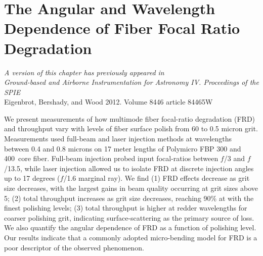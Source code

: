 \chapter[Fiber Focal Ration Degradation]{The Angular and Wavelength Dependence of Fiber Focal Ratio Degradation}
\label{chap:FRD}

\vfill

\begin{flushright}
  \fixspacing
  \textit{A version of this chapter has previously appeared in\\
    \emph{Ground-based and Airborne Instrumentation for Astronomy IV. Proceedings of the SPIE}}\\
    \vspace{1ex}
    Eigenbrot, Bershady, and Wood 2012. Volume 8446 article 84465W
\end{flushright}

\vspace{1in}

\cleardoublepage

\begin{chabstract}
  We present measurements of how multimode fiber focal-ratio degradation
  (FRD) and throughput vary with levels of fiber surface polish from 60
  to 0.5 micron grit. Measurements used full-beam and laser injection
  methods at wavelengths between 0.4 and 0.8 microns on 17 meter lengths
  of Polymicro FBP 300 and 400\mum\ core fiber. Full-beam injection
  probed input focal-ratios between $f$/3 and $f$/13.5, while laser
  injection allowed us to isolate FRD at discrete injection angles up to
  17 degrees ($f$/1.6 marginal ray). We find (1) FRD effects decrease as
  grit size decreases, with the largest gains in beam quality occurring
  at grit sizes above 5\mum; (2) total throughput increases as grit
  size decreases, reaching 90\% at \filtI with the finest polishing
  levels; (3) total throughput is higher at redder wavelengths for
  coarser polishing grit, indicating surface-scattering as the primary
  source of loss. We also quantify the angular dependence of FRD as a
  function of polishing level. Our results indicate that a commonly
  adopted micro-bending model for FRD is a poor descriptor of the
  observed phenomenon.
\end{chabstract}
\cleardoublepage


